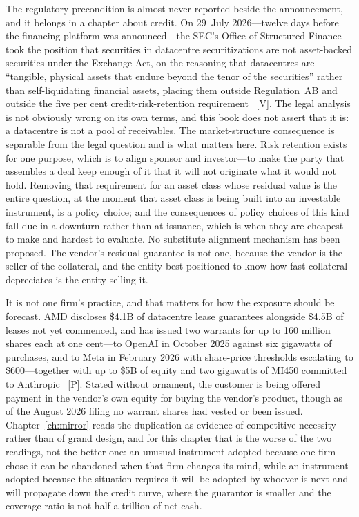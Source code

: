 The regulatory precondition is almost never reported beside the announcement, and it belongs in a chapter about credit. On 29~July 2026---twelve days before the financing platform was announced---the SEC's Office of Structured Finance took the position that securities in datacentre securitizations are not asset-backed securities under the Exchange Act, on the reasoning that datacentres are ``tangible, physical assets that endure beyond the tenor of the securities'' rather than self-liquidating financial assets, placing them outside Regulation~AB and outside the five per cent credit-risk-retention requirement~\cite{sec-dcs} [V]. The legal analysis is not obviously wrong on its own terms, and this book does not assert that it is: a datacentre is not a pool of receivables. The market-structure consequence is separable from the legal question and is what matters here. Risk retention exists for one purpose, which is to align sponsor and investor---to make the party that assembles a deal keep enough of it that it will not originate what it would not hold. Removing that requirement for an asset class whose residual value is the entire question, at the moment that asset class is being built into an investable instrument, is a policy choice; and the consequences of policy choices of this kind fall due in a downturn rather than at issuance, which is when they are cheapest to make and hardest to evaluate. No substitute alignment mechanism has been proposed. The vendor's residual guarantee is not one, because the vendor is the seller of the collateral, and the entity best positioned to know how fast collateral depreciates is the entity selling it.

It is not one firm's practice, and that matters for how the exposure should be forecast. AMD discloses \$4.1B of datacentre lease guarantees alongside \$4.5B of leases not yet commenced, and has issued two warrants for up to 160 million shares each at one cent---to OpenAI in October 2025 against six gigawatts of purchases, and to Meta in February 2026 with share-price thresholds escalating to \$600---together with up to \$5B of equity and two gigawatts of MI450 committed to Anthropic~\cite{amd-warrants,amd-q2-2026} [P]. Stated without ornament, the customer is being offered payment in the vendor's own equity for buying the vendor's product, though as of the August 2026 filing no warrant shares had vested or been issued. Chapter~\ref{ch:mirror} reads the duplication as evidence of competitive necessity rather than of grand design, and for this chapter that is the worse of the two readings, not the better one: an unusual instrument adopted because one firm chose it can be abandoned when that firm changes its mind, while an instrument adopted because the situation requires it will be adopted by whoever is next and will propagate down the credit curve, where the guarantor is smaller and the coverage ratio is not half a trillion of net cash.

